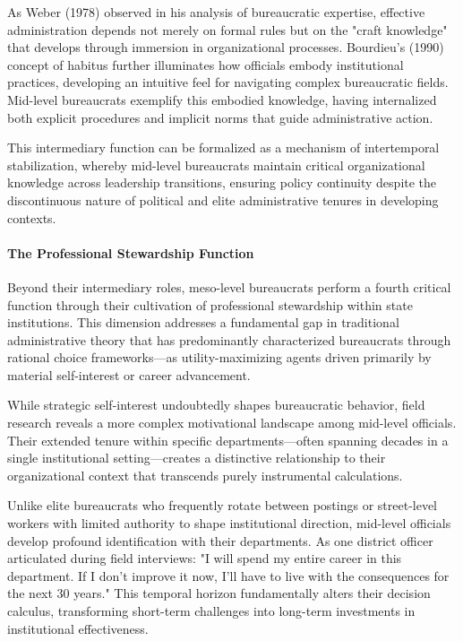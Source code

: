As Weber (1978) observed in his analysis of bureaucratic expertise, effective administration depends not merely on formal rules but on the "craft knowledge" that develops through immersion in organizational processes. Bourdieu's (1990) concept of habitus further illuminates how officials embody institutional practices, developing an intuitive feel for navigating complex bureaucratic fields. Mid-level bureaucrats exemplify this embodied knowledge, having internalized both explicit procedures and implicit norms that guide administrative action.

This intermediary function can be formalized as a mechanism of intertemporal stabilization, whereby mid-level bureaucrats maintain critical organizational knowledge across leadership transitions, ensuring policy continuity despite the discontinuous nature of political and elite administrative tenures in developing contexts.

\paragraph{The Professional Stewardship Function}

Beyond their intermediary roles, meso-level bureaucrats perform a fourth critical function through their cultivation of professional stewardship within state institutions. This dimension addresses a fundamental gap in traditional administrative theory that has predominantly characterized bureaucrats through rational choice frameworks—as utility-maximizing agents driven primarily by material self-interest or career advancement.

While strategic self-interest undoubtedly shapes bureaucratic behavior, field research reveals a more complex motivational landscape among mid-level officials. Their extended tenure within specific departments—often spanning decades in a single institutional setting—creates a distinctive relationship to their organizational context that transcends purely instrumental calculations.

Unlike elite bureaucrats who frequently rotate between postings or street-level workers with limited authority to shape institutional direction, mid-level officials develop profound identification with their departments. As one district officer articulated during field interviews: "I will spend my entire career in this department. If I don't improve it now, I'll have to live with the consequences for the next 30 years." This temporal horizon fundamentally alters their decision calculus, transforming short-term challenges into long-term investments in institutional effectiveness.

